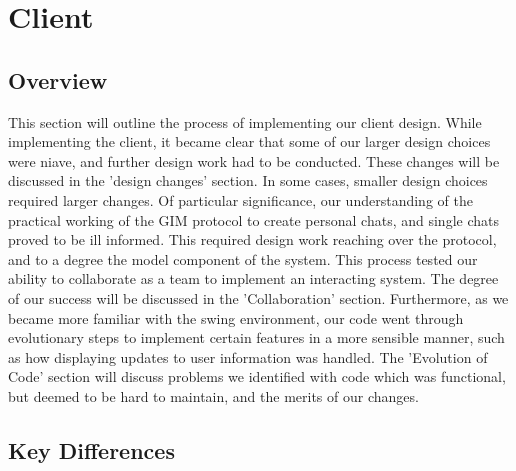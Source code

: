 \section{Client}

\subsection{Overview}

This section will outline the process of implementing our client design. While implementing the client, it became clear that some of our larger design choices were niave, and further design work had to be conducted. These changes will be discussed in the 'design changes' section. In some cases, smaller design choices required larger changes. Of particular significance, our understanding of the practical working of the GIM protocol to create personal chats, and single chats proved to be ill informed. This required design work reaching over the protocol, and to a degree the model component of the system. This process tested our ability to collaborate as a team to implement an interacting system. The degree of our success will be discussed in the 'Collaboration' section. Furthermore, as we became more familiar with the swing environment, our code went through evolutionary steps to implement certain features in a more sensible manner, such as how displaying updates to user information was handled. The 'Evolution of Code' section will discuss problems we identified with code which was functional, but deemed to be hard to maintain, and the merits of our changes. 

\subsection{Key Differences}

